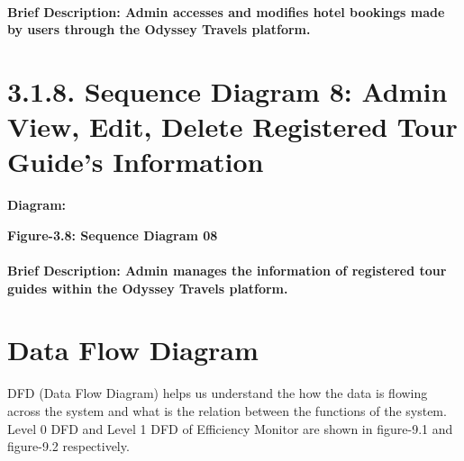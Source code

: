 \documentclass{scrreprt}
\begin{document}
\paragraph {\textnormal{Brief Description: 
Admin accesses and modifies hotel bookings made by users through the Odyssey Travels platform.}}


\section*{\textbf{3.1.8. Sequence Diagram 8: Admin View, Edit, Delete Registered Tour Guide's Information}}
\textbf{Diagram:}
\newline

\begin{center}
    \parbox{0.8\textwidth}{ 
        \centering
    }
\end{center}
\begin{center}
    \parbox{0.8\textwidth}{ 
        \centering
        \textbf{Figure-3.8: Sequence Diagram 08}
    }
\end{center}

\paragraph {\textnormal{Brief Description: 
Admin manages the information of registered tour guides within the Odyssey Travels platform.}}


\section{Data Flow Diagram}
DFD (Data Flow Diagram) helps us understand the how the data is flowing across the system and
what is the relation between the functions of the system.
Level 0 DFD and Level 1 DFD of Efficiency Monitor are shown in figure-9.1 and figure-9.2
respectively.
\end{document}
